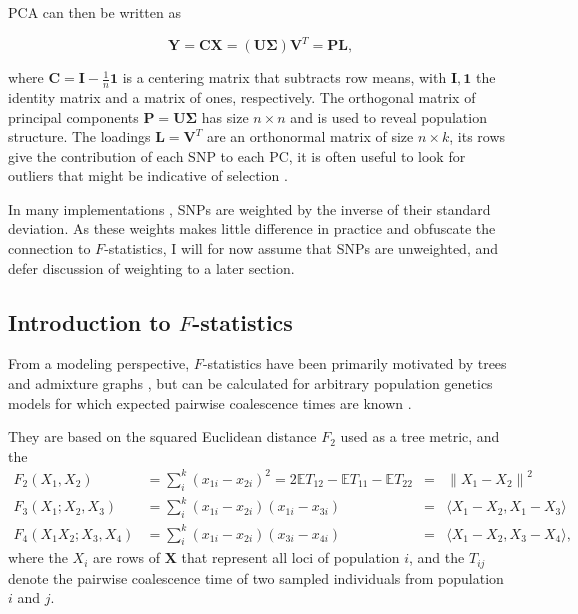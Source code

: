 \documentclass[12pt,a4pape, fullpage]{article}
\newcommand{\normsq}[1]{\left\lVert#1\right\rVert^2}
\newcommand{\MX}{\mathbf{X}} %
\newcommand{\MC}{\mathbf{C}} %
\newcommand{\MY}{\mathbf{Y}} %
\newcommand{\MP}{\mathbf{P}} %
\newcommand{\ML}{\mathbf{L}} %
\newcommand{\MSINGULAR}{\mathbf{\Sigma}} %
\begin{document}
	PCA can then be written as
	
	\begin{equation}
	\MY = \MC\MX = (\mathbf{U} \MSINGULAR) \mathbf{V}^T = \MP\ML\text{,}
	\end{equation}
	
	where $\MC = \mathbf{I} -\frac{1}{n}\mathbf{1}$ is a centering matrix that subtracts row means, with $\mathbf{I}, \mathbf{1}$  the identity matrix and a matrix of ones, respectively. The orthogonal matrix of principal components $\MP=\mathbf{U}\MSINGULAR$ has size $n \times n$ and is used to reveal population structure. The loadings $\ML=\mathbf{V}^T$ are an orthonormal matrix of size $n \times k$, its rows give the contribution of each SNP to each PC, it is often useful to look for outliers that might be indicative of selection \cite[e.g][]{francois2010}.
	
	In many  implementations \citep[e.g]{patterson2006}, SNPs are weighted by the inverse of their standard deviation. As these weights makes little difference in practice and obfuscate the connection to $F$-statistics, I will for now assume that SNPs are unweighted, and defer discussion of weighting to a later section.
	

	
\subsection{Introduction to $F$-statistics}
From a modeling perspective, $F$-statistics have been primarily motivated by trees and admixture graphs \citep{patterson2012}, but can be calculated for arbitrary population genetics models for which expected pairwise coalescence times are known \citep{peter2016}. 

They are based on the squared Euclidean distance $F_2$ used as a tree metric, and the 
\begin{subequations}
	\begin{align}
	F_2(X_1, X_2) &= \sum_i^k (x_{1i} - x_{2i})^2 = 2\mathbb{E}T_{12} - \mathbb{E}T_{11} - \mathbb{E}T_{22} &=& \normsq{X_1 - X_2}\\
	F_3(X_1; X_2, X_3) &= \sum_i^k (x_{1i} - x_{2i})(x_{1i} - x_{3i}) &=& \langle X_1 - X_2, X_1 - X_3 \rangle\\
	F_4(X_1 X_2; X_3, X_4) &= \sum_i^k (x_{1i} - x_{2i})(x_{3i} - x_{4i}) &=& \langle X_1 - X_2, X_3 - X_4 \rangle,
	\end{align}
\end{subequations}
where the $X_i$ are rows of $\MX$ that represent all loci of population $i$, and the $T_{ij}$ denote the pairwise coalescence time of two sampled individuals from population $i$ and $j$.
\end{document}
